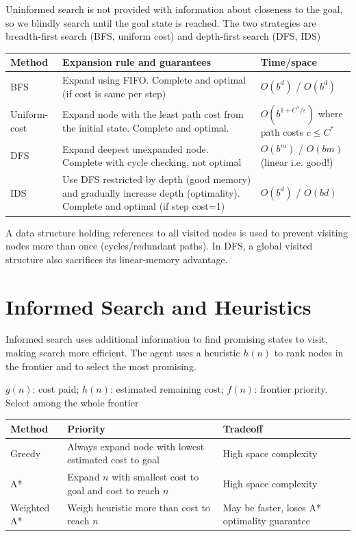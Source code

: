 \documentclass{report}
\begin{document}
Uninformed search is not provided with information about closeness to the goal, so we blindly search until the goal state is reached. The two strategies are breadth-first search (BFS, uniform cost) and depth-first search (DFS, IDS)

\begin{center}
\begin{tabularx}{\textwidth}{@{}l>{\raggedright\arraybackslash}X>{\raggedright\arraybackslash}X@{}}
\toprule
Method & Expansion rule and guarantees & Time/space\\\midrule
BFS & Expand using FIFO. Complete and optimal (if cost is same per step) & $O(b^d)$ / $O(b^d)$\\
Uniform-cost & Expand node with the least path cost from the initial state. Complete and optimal. & $O(b^{1+C^*/\varepsilon})$ where path costs $c\leq C^*$\\
DFS & Expand deepest unexpanded node. Complete with cycle checking, not optimal & $O(b^m)$ / $O(bm)$ (linear i.e. good!)\\
IDS & Use DFS restricted by depth (good memory) and gradually increase depth (optimality). Complete and optimal (if step cost=1) & $O(b^d)$ / $O(bd)$\\\bottomrule
\end{tabularx}
\end{center}

A data structure holding references to all visited nodes is used to prevent visiting nodes more than once (cycles/redundant paths). In DFS, a global visited structure also sacrifices its linear-memory advantage.

\section{Informed Search and Heuristics}

Informed search uses additional information to find promising states to visit, making search more efficient. The agent uses a heuristic $h(n)$ to rank nodes in the frontier and to select the most promising.

\textbf{$g(n)$}: cost paid; \textbf{$h(n)$}: estimated remaining cost; \textbf{$f(n)$}: frontier priority. Select among the whole frontier
\begin{center}
\begin{tabularx}{\textwidth}{@{}l l >{\raggedright\arraybackslash}X@{}}
\toprule
Method & Priority & Tradeoff\\\midrule
Greedy & Always expand node with lowest estimated cost to goal & High space complexity \\
A* & Expand $n$ with smallest cost to goal and cost to reach $n$ & High space complexity \\
Weighted A* & Weigh heuristic more than cost to reach $n$ & May be faster, loses A* optimality guarantee \\\bottomrule
\end{tabularx}
\end{center}
\end{document}
